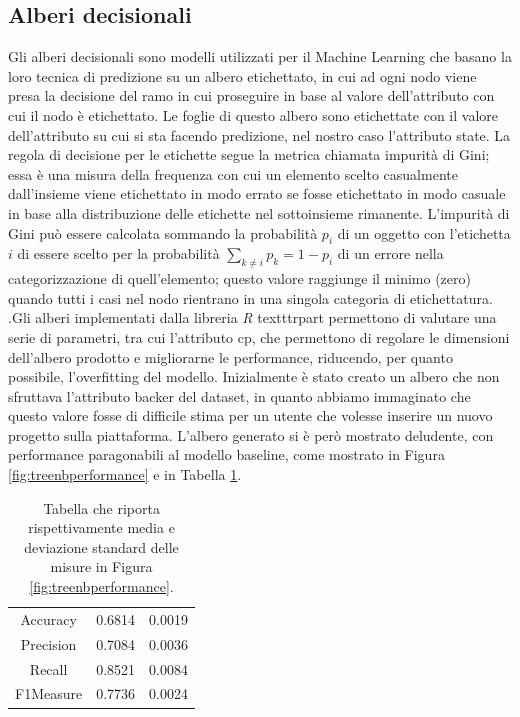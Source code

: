 \subsection{Alberi decisionali}
Gli alberi decisionali sono modelli utilizzati per il Machine Learning che basano la loro tecnica di predizione su un albero etichettato, in cui ad ogni nodo viene presa la decisione del ramo in cui proseguire in base al valore dell'attributo con cui il nodo è etichettato. Le foglie di questo albero sono etichettate con il valore dell'attributo su cui si sta facendo predizione, nel nostro caso l'attributo state. La regola di decisione per le etichette segue la metrica chiamata impurità di Gini; essa è una misura della frequenza con cui un elemento scelto casualmente dall'insieme viene etichettato in modo errato se fosse etichettato in modo casuale in base alla distribuzione delle etichette nel sottoinsieme rimanente. L'impurità di Gini può essere calcolata sommando la probabilità $p_i$ di un oggetto con l'etichetta $i$ di essere scelto per la probabilità $ \sum\limits_{k\neq i} p_{k}=1-p_{i} $ di un errore nella categorizzazione di quell'elemento; questo valore raggiunge il minimo (zero) quando tutti i casi nel nodo rientrano in una singola categoria di etichettatura. .Gli alberi implementati dalla libreria \emph{R} texttt{rpart} permettono di valutare una serie di parametri, tra cui l'attributo cp, che permettono di regolare le dimensioni dell'albero prodotto e migliorarne le performance, riducendo, per quanto possibile, l'overfitting del modello.
Inizialmente è stato creato un albero che non sfruttava l'attributo backer del dataset, in quanto abbiamo immaginato che questo valore fosse di difficile stima per un utente che volesse inserire un nuovo progetto sulla piattaforma. L'albero generato si è però mostrato deludente, con performance paragonabili al modello baseline, come mostrato in Figura \ref{fig:treenbperformance} e in Tabella \ref{tab:treenbperformance}.
\begin{table}
	\caption{Tabella che riporta rispettivamente media e deviazione standard delle misure in Figura \ref{fig:treenbperformance}.}
	\label{tab:treenbperformance}
	\centering
	\begin{tabular}{c|c|c}
		Accuracy & 0.6814 & 0.0019 \\ 
		Precision & 0.7084 & 0.0036 \\
		Recall & 0.8521 & 0.0084 \\
		F1Measure & 0.7736 & 0.0024 \\
	\end{tabular}
\end{table}
